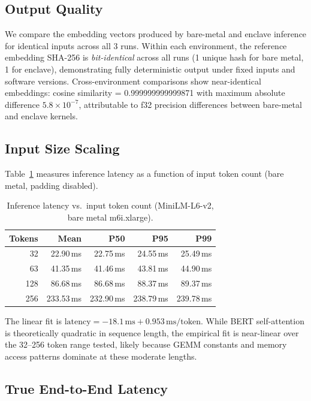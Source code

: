 \documentclass[11pt,a4paper]{article}
\newcommand{\BenchInstance}{m6i.xlarge}
\newcommand{\BenchModelName}{MiniLM-L6-v2}
\newcommand{\BenchNumRuns}{3}
\begin{document}
\subsection{Output Quality}

We compare the embedding vectors produced by bare-metal and enclave inference for identical inputs across all \BenchNumRuns{} runs.
Within each environment, the reference embedding SHA-256 is \emph{bit-identical} across all runs (1 unique hash for bare metal, 1 for enclave), demonstrating fully deterministic output under fixed inputs and software versions.
Cross-environment comparisons show near-identical embeddings: cosine similarity = 0.999999999999871 with maximum absolute difference $5.8 \times 10^{-7}$, attributable to f32 precision differences between bare-metal and enclave kernels.

\subsection{Input Size Scaling}

Table~\ref{tab:input-scaling} measures inference latency as a function of input token count (bare metal, padding disabled).

\begin{table}[ht]
\centering
\caption{Inference latency vs.\ input token count (\BenchModelName{}, bare metal \BenchInstance{}).}
\label{tab:input-scaling}
\begin{tabular}{rrrrr}
\hline
\textbf{Tokens} & \textbf{Mean} & \textbf{P50} & \textbf{P95} & \textbf{P99} \\
\hline
32  & 22.90\,ms  & 22.75\,ms  & 24.55\,ms  & 25.49\,ms \\
63  & 41.35\,ms  & 41.46\,ms  & 43.81\,ms  & 44.90\,ms \\
128 & 86.68\,ms  & 86.68\,ms  & 88.37\,ms  & 89.37\,ms \\
256 & 233.53\,ms & 232.90\,ms & 238.79\,ms & 239.78\,ms \\
\hline
\end{tabular}
\end{table}

The linear fit is $\mathrm{latency} = -18.1\,\text{ms} + 0.953\,\text{ms/token}$.
While BERT self-attention is theoretically quadratic in sequence length, the empirical fit is near-linear over the 32--256 token range tested, likely because GEMM constants and memory access patterns dominate at these moderate lengths.

\subsection{True End-to-End Latency}
\end{document}
